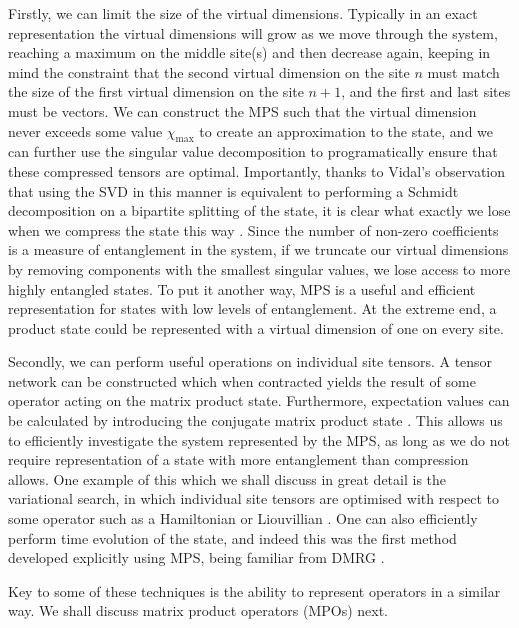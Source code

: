  Firstly, we can limit the size of the virtual dimensions. Typically in an exact representation the virtual dimensions will grow as we move through the system, reaching a maximum on the middle site(s) and then decrease again, keeping in mind the constraint that the second virtual dimension on the site \(n\) must match the size of the first virtual dimension on the site \(n+1\), and the first and last sites must be vectors. We can construct the MPS such that the virtual dimension never exceeds some value \(\chi_{\mathrm{max}}\) to create an approximation to the state, and we can further use the singular value decomposition to programatically ensure that these compressed tensors are optimal. Importantly, thanks to Vidal's observation that using the SVD in this manner is equivalent to performing a Schmidt decomposition on a bipartite splitting of the state, it is clear what exactly we lose when we compress the state this way \cite{Vidal2003}. Since the number of non-zero coefficients is a measure of entanglement in the system, if we truncate our virtual dimensions by removing components with the smallest singular values, we lose access to more highly entangled states. To put it another way, MPS is a useful and efficient representation for states with low levels of entanglement. At the extreme end, a product state could be represented with a virtual dimension of one on every site.

 Secondly, we can perform useful operations on individual site tensors. A tensor network can be constructed which when contracted yields the result of some operator acting on the matrix product state. Furthermore, expectation values can be calculated by introducing the conjugate matrix product state \cite{Schollwock2011,Orus2014}. This allows us to efficiently investigate the system represented by the MPS, as long as we do not require representation of a state with more entanglement than compression allows. One example of this which we shall discuss in great detail is the variational search, in which individual site tensors are optimised with respect to some operator such as a Hamiltonian or Liouvillian \cite{Verstraete2004,Cui2015}. One can also efficiently perform time evolution of the state, and indeed this was the first method developed explicitly using MPS, being familiar from DMRG \cite{Vidal2004}.

 Key to some of these techniques is the ability to represent operators in a similar way. We shall discuss matrix product operators (MPOs) next.

